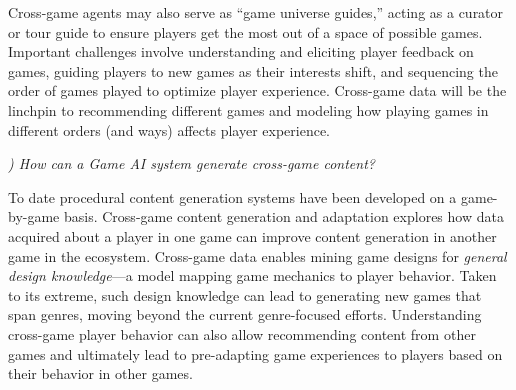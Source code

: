 \documentclass[conference]{IEEEtran}
\newcounter{questionno}
\newcommand{\mytodo}[1]{\textbf{[[#1]]}}
\newcommand{\subsubsectionx}[1]{{\em {\arabic{questionno}) #1}}
	\addtocounter{questionno}{1}
	}
\begin{document}
%
%


Cross-game agents may also serve as ``game universe guides,'' acting as a curator or tour guide to ensure players get the most out of a space of possible games.
Important challenges 
involve understanding and eliciting player feedback on games, guiding players to new games as their interests shift, and sequencing the order of games played to optimize player experience.
Cross-game data will be the linchpin to recommending different games and modeling how playing games in different orders (and ways) affects player experience.

\subsubsectionx{How can a Game AI system generate cross-game content?}
%
To date procedural content generation systems have been developed on a game-by-game basis.
Cross-game content generation and adaptation explores how data acquired about a player in one game can improve content generation in another game in the ecosystem.
Cross-game data enables mining game designs for {\em general design knowledge}---a model mapping game mechanics to player behavior. 
Taken to its extreme, such design knowledge can lead to generating new games that span genres, moving beyond the current genre-focused efforts.
Understanding cross-game player behavior can also allow recommending content from other games and ultimately lead to pre-adapting game experiences to players based on their behavior in other games. 
\end{document}
